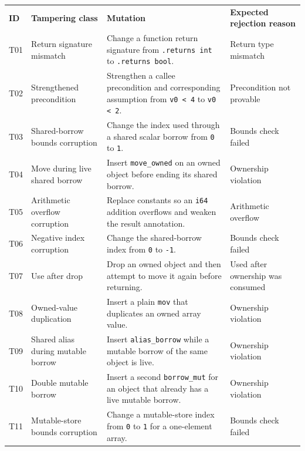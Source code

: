 \begin{table}[p]
  \centering
  \scriptsize
  \begin{tabular}{p{} p{} p{} p{}}
    \tablehline
    \textbf{ID} & \textbf{Tampering class} & \textbf{Mutation} & \textbf{Expected rejection reason} \\
    \tablehline
    T01 & Return signature mismatch
        & Change a function return signature from \texttt{.returns int} to \texttt{.returns bool}.
        & Return type mismatch \\
    T02 & Strengthened precondition
        & Strengthen a callee precondition and corresponding assumption from \texttt{v0 < 4} to \texttt{v0 < 2}.
        & Precondition not provable \\
    T03 & Shared-borrow bounds corruption
        & Change the index used through a shared scalar borrow from \texttt{0} to \texttt{1}.
        & Bounds check failed \\
    T04 & Move during live shared borrow
        & Insert \texttt{move\_owned} on an owned object before ending its shared borrow.
        & Ownership violation \\
    T05 & Arithmetic overflow corruption
        & Replace constants so an \texttt{i64} addition overflows and weaken the result annotation.
        & Arithmetic overflow \\
    T06 & Negative index corruption
        & Change the shared-borrow index from \texttt{0} to \texttt{-1}.
        & Bounds check failed \\
    T07 & Use after drop
        & Drop an owned object and then attempt to move it again before returning.
        & Used after ownership was consumed \\
    T08 & Owned-value duplication
        & Insert a plain \texttt{mov} that duplicates an owned array value.
        & Ownership violation \\
    T09 & Shared alias during mutable borrow
        & Insert \texttt{alias\_borrow} while a mutable borrow of the same object is live.
        & Ownership violation \\
    T10 & Double mutable borrow
        & Insert a second \texttt{borrow\_mut} for an object that already has a live mutable borrow.
        & Ownership violation \\
    T11 & Mutable-store bounds corruption
        & Change a mutable-store index from \texttt{0} to \texttt{1} for a one-element array.
        & Bounds check failed \\

\end{tabular}
\end{table}
